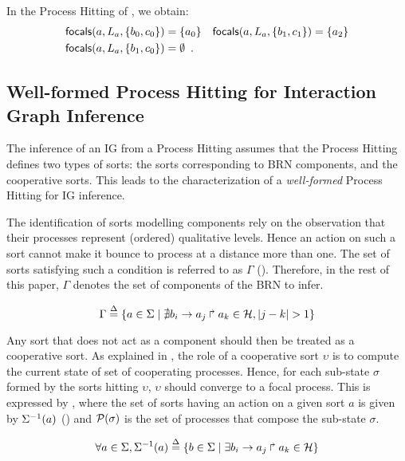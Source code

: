 \begin{example*}
In the Process Hitting of , we obtain:
\begin{align*}
\mathsf{focals}(a,L_a,\{b_0,c_0\}) &= \{ a_0 \}
&
\mathsf{focals}(a,L_a,\{b_1,c_1\}) &= \{ a_2 \}\\
\mathsf{focals}(a,L_a,\{b_1,c_0\}) &= \emptyset\enspace.
\end{align*}
\end{example*}

\subsection{Well-formed Process Hitting for Interaction Graph Inference}\label{ssec:wf}

The inference of an IG from a Process Hitting assumes that the Process Hitting defines two types of
sorts:
the sorts corresponding to BRN components, and the cooperative sorts.
This leads to the characterization of a \emph{well-formed} Process Hitting for IG inference.

The identification of sorts modelling components rely on the observation that their processes
represent (ordered) qualitative levels.
Hence an action on such a sort cannot make it bounce to process at a distance more than one.
The set of sorts satisfying such a condition is referred to as $\Gamma$
().
Therefore, in the rest of this paper, $\Gamma$ denotes the set of components of the BRN to infer.

\begin{equation}
\Gamma \stackrel{\Delta}= \{a \in \Sigma \mid \nexists b_i\rightarrow a_j\Rsh a_k \in \mathcal{H}, |j - k| > 1\} \\
\label{eq:PH-components}
\end{equation}

Any sort that does not act as a component should then be treated as a cooperative sort.
As explained in , the role of a cooperative sort $\upsilon$ is to compute the current
state of set of cooperating processes.
Hence, for each sub-state $\sigma$ formed by the sorts hitting $\upsilon$, $\upsilon$ should
converge to a focal process.
This is expressed by , where
the set of sorts having an action on a given sort $a$ is given by 
$\Sigma^{-1}(a)$ ()
and $\mathcal{P}(\sigma)$ is the set of processes that compose the sub-state $\sigma$.

\begin{equation}
\forall a \in \Sigma, \Sigma^{-1}(a) \stackrel{\Delta}= \{b \in \Sigma \mid \exists b_i\rightarrow a_j\Rsh a_k\in\mathcal{H} \}
\label{eq:ph_direct_predec}
\end{equation}

